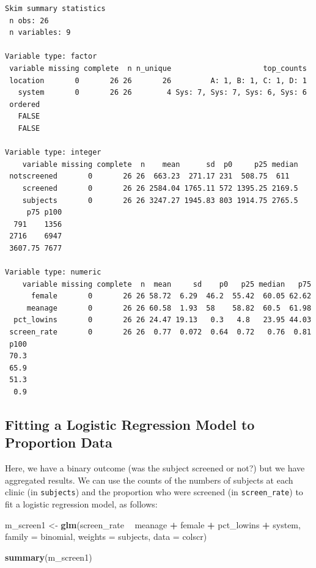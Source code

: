 \documentclass[]{book}
\newenvironment{Shaded}{\begin{snugshade}}{\end{snugshade}}
\newcommand{\KeywordTok}[1]{\textcolor[rgb]{0.13,0.29,0.53}{\textbf{#1}}}
\newcommand{\DataTypeTok}[1]{\textcolor[rgb]{0.13,0.29,0.53}{#1}}
\newcommand{\StringTok}[1]{\textcolor[rgb]{0.31,0.60,0.02}{#1}}
\newcommand{\OperatorTok}[1]{\textcolor[rgb]{0.81,0.36,0.00}{\textbf{#1}}}
\newcommand{\NormalTok}[1]{#1}
\theoremstyle{definition}
\theoremstyle{definition}
\theoremstyle{definition}
\theoremstyle{remark}
\begin{document}
\begin{verbatim}
Skim summary statistics
 n obs: 26 
 n variables: 9 

Variable type: factor 
 variable missing complete  n n_unique                     top_counts
 location       0       26 26       26         A: 1, B: 1, C: 1, D: 1
   system       0       26 26        4 Sys: 7, Sys: 7, Sys: 6, Sys: 6
 ordered
   FALSE
   FALSE

Variable type: integer 
    variable missing complete  n    mean      sd  p0     p25 median
 notscreened       0       26 26  663.23  271.17 231  508.75  611  
    screened       0       26 26 2584.04 1765.11 572 1395.25 2169.5
    subjects       0       26 26 3247.27 1945.83 803 1914.75 2765.5
     p75 p100
  791    1356
 2716    6947
 3607.75 7677

Variable type: numeric 
    variable missing complete  n  mean     sd    p0   p25 median   p75
      female       0       26 26 58.72  6.29  46.2  55.42  60.05 62.62
     meanage       0       26 26 60.58  1.93  58    58.82  60.5  61.98
  pct_lowins       0       26 26 24.47 19.13   0.3   4.8   23.95 44.03
 screen_rate       0       26 26  0.77  0.072  0.64  0.72   0.76  0.81
 p100
 70.3
 65.9
 51.3
  0.9
\end{verbatim}

\subsection{Fitting a Logistic Regression Model to Proportion
Data}\label{fitting-a-logistic-regression-model-to-proportion-data}

Here, we have a binary outcome (was the subject screened or not?) but we
have aggregated results. We can use the counts of the numbers of
subjects at each clinic (in \texttt{subjects}) and the proportion who
were screened (in \texttt{screen\_rate}) to fit a logistic regression
model, as follows:

\begin{Shaded}
\begin{Highlighting}[]
\NormalTok{m_screen1 <-}\StringTok{  }\KeywordTok{glm}\NormalTok{(screen_rate }\OperatorTok{~}\StringTok{ }\NormalTok{meanage }\OperatorTok{+}\StringTok{ }\NormalTok{female }\OperatorTok{+}\StringTok{ }
\StringTok{                    }\NormalTok{pct_lowins }\OperatorTok{+}\StringTok{ }\NormalTok{system, }\DataTypeTok{family =}\NormalTok{ binomial, }
                  \DataTypeTok{weights =}\NormalTok{ subjects, }\DataTypeTok{data =}\NormalTok{ colscr)}

\KeywordTok{summary}\NormalTok{(m_screen1)}
\end{Highlighting}
\end{Shaded}
\end{document}
